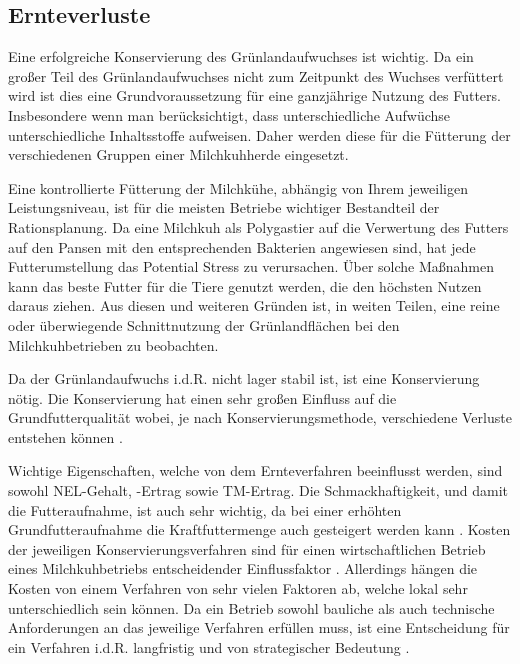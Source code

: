 \subsection{Ernteverluste}
\label{subsec:Lit:Ernte}

Eine erfolgreiche Konservierung des Grünlandaufwuchses ist wichtig.
Da ein großer Teil des Grünlandaufwuchses nicht zum Zeitpunkt des Wuchses verfüttert wird ist dies eine Grundvoraussetzung für eine ganzjährige Nutzung des Futters.
Insbesondere wenn man berücksichtigt, dass unterschiedliche Aufwüchse unterschiedliche Inhaltsstoffe aufweisen.
Daher werden diese für die Fütterung der verschiedenen Gruppen einer Milchkuhherde eingesetzt. 

Eine kontrollierte Fütterung der Milchkühe, abhängig von Ihrem jeweiligen Leistungsniveau, ist für die meisten Betriebe wichtiger Bestandteil der Rationsplanung. 
Da eine Milchkuh als Polygastier auf die Verwertung des Futters auf den Pansen mit den entsprechenden Bakterien angewiesen sind, hat jede Futterumstellung das Potential Stress zu verursachen.
Über solche Maßnahmen kann das beste Futter für die Tiere genutzt werden, die den höchsten Nutzen daraus ziehen.
Aus diesen und weiteren Gründen ist, in weiten Teilen, eine reine oder überwiegende Schnittnutzung der Grünlandflächen bei den Milchkuhbetrieben zu beobachten.

Da der Grünlandaufwuchs i.d.R. nicht lager stabil ist, ist eine Konservierung nötig.
Die Konservierung hat einen sehr großen Einfluss auf die Grundfutterqualität wobei, je nach Konservierungsmethode, verschiedene Verluste entstehen können \parencite[30]{fritz2018wirtschaftliche}.

Wichtige Eigenschaften, welche von dem Ernteverfahren beeinflusst werden, sind sowohl \ac{NEL}-Gehalt, -Ertrag sowie \ac{TM}-Ertrag.
Die Schmackhaftigkeit, und damit die Futteraufnahme, ist auch sehr wichtig, da bei einer erhöhten Grundfutteraufnahme die Kraftfuttermenge auch gesteigert werden kann \parencite[36]{gruber2013grundfutterqualitat}.
Kosten der jeweiligen Konservierungsverfahren sind für einen wirtschaftlichen Betrieb eines Milchkuhbetriebs entscheidender Einflussfaktor \parencite[75]{fritz2018ansatz}. 
Allerdings hängen die Kosten von einem Verfahren von sehr vielen Faktoren ab, welche lokal sehr unterschiedlich sein können.
Da ein Betrieb sowohl bauliche als auch technische Anforderungen an das jeweilige Verfahren erfüllen muss, ist eine Entscheidung für ein Verfahren i.d.R. langfristig und von strategischer Bedeutung \parencite[75]{fritz2018ansatz}.

